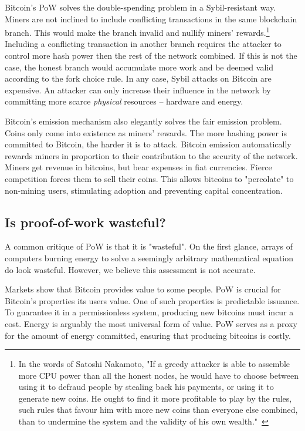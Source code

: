 Bitcoin's PoW solves the double-spending problem in a Sybil-resistant way.
Miners are not inclined to include conflicting transactions in the same blockchain branch.
This would make the branch invalid and nullify miners' rewards.\footnote{In the words of Satoshi Nakamoto, "If a greedy attacker is able to assemble more CPU power than all the honest nodes, he would have to choose between using it to defraud people by stealing back his payments, or using it to generate new coins. He ought to find it more profitable to play by the rules, such rules that favour him with more new coins than everyone else combined, than to undermine the system and the validity of his own wealth."~\cite{nakamoto2008bitcoin}}
Including a conflicting transaction in another branch requires the attacker to control more hash power then the rest of the network combined.
If this is not the case, the honest branch would accumulate more work and be deemed valid according to the fork choice rule.
In any case, Sybil attacks on Bitcoin are expensive.
An attacker can only increase their influence in the network by committing more scarce \textit{physical} resources -- hardware and energy.

Bitcoin's emission mechanism also elegantly solves the fair emission problem.
Coins only come into existence as miners' rewards.
The more hashing power is committed to Bitcoin, the harder it is to attack.
Bitcoin emission automatically rewards miners in proportion to their contribution to the security of the network.
Miners get revenue in bitcoins, but bear expenses in fiat currencies.
Fierce competition forces them to sell their coins.
This allows bitcoins to "percolate" to non-mining users, stimulating adoption and preventing capital concentration.


\subsection{Is proof-of-work wasteful?}

A common critique of PoW is that it is "wasteful".
On the first glance, arrays of computers burning energy to solve a seemingly arbitrary mathematical equation do look wasteful.
However, we believe this assessment is not accurate.

Markets show that Bitcoin provides value to some people.
PoW is crucial for Bitcoin's properties its users value.
One of such properties is predictable issuance.
To guarantee it in a permissionless system, producing new bitcoins must incur a cost.
Energy is arguably the most universal form of value.
PoW serves as a proxy for the amount of energy committed, ensuring that producing bitcoins is costly.


